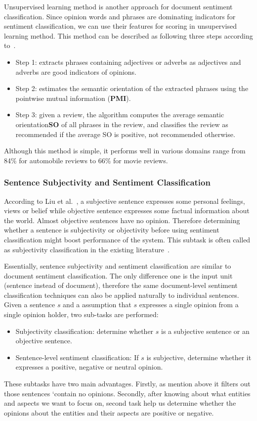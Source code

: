\documentclass{article}
\begin{document}
Unsupervised learning method is another approach for document sentiment classification. 
Since opinion words and phrases are dominating indicators for sentiment classification, we can use their features for scoring in unsupervised learning method.
This method can be described as following three steps according to~\cite{100}.
\begin{itemize}
	\item Step 1: extracts phrases containing adjectives or adverbs as adjectives and adverbs are good indicators of opinions.
	\item Step 2: estimates the semantic orientation of the extracted phrases using the pointwise mutual information (\textbf{PMI}).
	\item Step 3: given a review, the algorithm computes the average semantic orientation\textbf{SO} of all phrases in the review, and classifies the review as recommended if the average SO is positive, not recommended otherwise.
\end{itemize}
Although this method is simple, it performs well in various domains range from 84\% for automobile reviews to 66\% for movie reviews.

\subsubsection{Sentence Subjectivity and Sentiment Classification}
According to Liu et al.~\cite{Liu2012}, a subjective sentence expresses some personal feelings, views or belief while objective sentence expresses some factual information about the world.
Almost objective sentences have no opinion.
Therefore determining whether a sentence is subjectivity or objectivity before using sentiment classification might boost performance of the system.
This subtask is often called as subjectivity classification in the existing literature~\cite{30, 87, 88, 106, 109, 110, 113}. 

Essentially, sentence subjectivity and sentiment classification are similar to document sentiment classification.
The only difference one is the input unit (sentence instead of document), therefore the same document-level sentiment classification techniques can also be applied naturally to individual sentences.
Given a sentence $s$ and a assumption that $s$ expresses a single opinion from a single opinion holder, two sub-tasks are performed:
\begin{itemize}
	\item Subjectivity classification: determine whether $s$ is a subjective sentence or an objective sentence.
	\item Sentence-level sentiment classification: If $s$ is subjective, determine whether it expresses a positive, negative or neutral opinion.
\end{itemize}
These subtasks have two main advantages. 
Firstly, as mention above it filters out those sentences `contain no opinions. 
Secondly, after knowing about what entities and aspects we want to focus on, second task help us determine whether the opinions about the entities and their aspects are positive or negative. 
\end{document}
